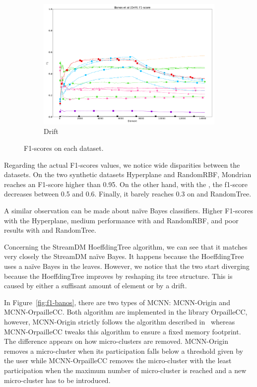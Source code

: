 \begin{figure}[ht]
\begin{subfigure}[t]{.5\linewidth}
		\includegraphics[width=\linewidth]{figures/results/drift_f1.png}
		\caption{Drift}
		\label{fig:f1-drift}
	\end{subfigure}

	\caption{F1-scores on each dataset.}
	\label{fig:f1}
\end{figure}

Regarding the actual F1-scores values, we notice wide disparities between the
datasets. On the two synthetic datasets Hyperplane and RandomRBF, Mondrian
reaches an F1-score higher than 0.95. On the other hand, with the
\banosdataset, the f1-score decreases between 0.5 and 0.6.  Finally, it barely
reaches 0.3 on \recofitdataset and RandomTree.

A similar observation can be made about naïve Bayes classifiers. Higher
F1-scores with the Hyperplane, medium performance with \banosdataset and
RandomRBF, and poor results with \recofitdataset and RandomTree.

Concerning the StreamDM HoeffdingTree algorithm, we can see that it matches
very closely the StreamDM naïve Bayes. It happens because the HoeffdingTree
uses a naïve Bayes in the leaves. However, we notice that the two start
diverging because the HoeffdingTree improves by reshaping its tree structure.
This is caused by either a suffisant amount of element or by a drift.

In Figure~\ref{fig:f1-banos}, there are two types of MCNN: MCNN-Origin and
MCNN-OrpailleCC.  Both algorithm are implemented in the library OrpailleCC,
however, MCNN-Origin strictly follows the algorithm described in~\cite{mc-nn}
whereas MCNN-OrpailleCC tweaks this algorithm to ensure a fixed memory
footprint. The difference appears on how micro-clusters are removed.
MCNN-Origin removes a micro-cluster when its participation falls below a
threshold given by the user while MCNN-OrpailleCC removes the micro-cluster with
the least participation when the maximum number of micro-cluster is reached and
a new micro-cluster has to be introduced.

